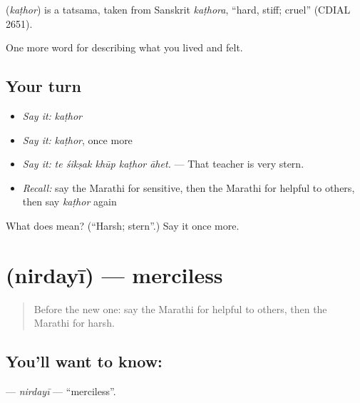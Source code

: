 \begin{cousinweb}
\textbf{} (\emph{kaṭhor}) is a tatsama, taken from Sanskrit \emph{kaṭhora}, \textquotedblleft{}hard, stiff; cruel\textquotedblright{} (CDIAL 2651).
\end{cousinweb}

\begin{grammarlens}[title={What you've built}]
One more word for describing what you lived and felt.
\end{grammarlens}

\subsection*{Your turn}
\begin{itemize}
\raggedright
  \item \emph{Say it:} \emph{kaṭhor}
  \item \emph{Say it:} \emph{kaṭhor}, once more
  \item \emph{Say it:} \emph{te śikṣak khūp kaṭhor āhet.} — That teacher is very stern.
  \item \emph{Recall:} say the Marathi for sensitive, then the Marathi for helpful to others, then say \emph{kaṭhor} again
\end{itemize}

\begin{tcolorbox}[breakable,colback=teal!4,colframe=teal!35!black,title={Before you move on}]
What does  mean? (\textquotedblleft{}Harsh; stern\textquotedblright{}.) Say it once more.
\end{tcolorbox}
\section[\texorpdfstring{\mr{निर्दयी} (nirdayī)}{निर्दयी (nirdayī)}]{ (nirdayī) — merciless}

\label{lesson:MR-C469-nirdayi}



\begin{quote}
Before the new one: say the Marathi for helpful to others, then the Marathi for harsh.
\end{quote}

\subsection*{You'll want to know: }
\textbf{} — \emph{nirdayī} — \textquotedblleft{}merciless\textquotedblright{}.

